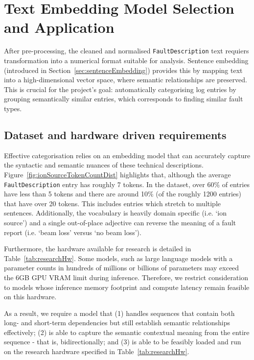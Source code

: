 \documentclass[10pt,oneside]{report}
\begin{document}
\section{Text Embedding Model Selection and Application}
After pre-processing, the cleaned and normalised \texttt{FaultDescription} text requiers transformation into a numerical format suitable for analysis. Sentence embedding (introduced in Section~\ref{sec:sentenceEmbedding}) provides this by mapping text into a high-dimensional vector space, where semantic relationships are preserved. This is crucial for the project's goal: automatically categorising log entries by grouping semantically similar entries, which corresponds to finding similar fault types. 

\subsection{Dataset and hardware driven requirements}
Effective categorisation relies on an embedding model that can accurately capture the syntactic and semantic nuances of these technical descriptions. Figure~\ref{fig:ionSourceTokenCountDist} highlights that, although the average \texttt{FaultDescription} entry has roughly 7 tokens. In the dataset, over 60\% of entries have less than 5 tokens and there are around 10\% (of the roughly 1200 entries) that have over 20 tokens. This includes entries which stretch to multiple sentences. Additionally, the vocabulary is heavily domain specific (i.e. `ion source') and a single out-of-place adjective can reverse the meaning of a fault report (i.e. `beam loss' versus `no beam loss').  

Furthermore, the hardware available for research is detailed in Table~\ref{tab:researchHw}. Some models, such as large language models with a parameter counts in hundreds of millions or billions of parameters may exceed the 6GB GPU VRAM limit during inference. Therefore, we restrict consideration to models whose inference memory footprint and compute latency remain feasible on this hardware.

As a result, we require a model that (1) handles sequences that contain both long- and short-term dependencies but still establish semantic relationships effectively; (2) is able to capture the semantic contextual meaning from the entire sequence - that is, bidirectionally; and (3) is able to be feasibly loaded and run on the research hardware specified in Table~\ref{tab:researchHw}.
\end{document}
